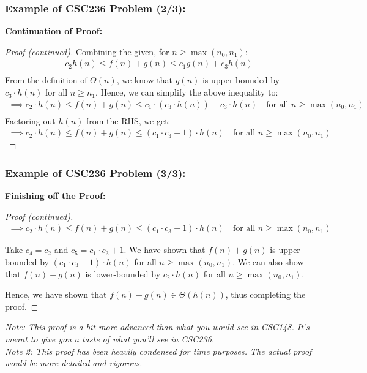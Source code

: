 \documentclass[hyperref={colorlinks,citecolor=blue,linkcolor=blue,urlcolor=blue}, aspectratio=1610]{beamer}
\begin{document}
\begin{frame}
  \frametitle{Example of CSC236 Problem (2/3):}
  \textbf{Continuation of Proof:}

  \begin{proof}[Proof (continued)]
    Combining the given, for $n \geq \max(n_0, n_1)$:
    \begin{align*}
      c_2h(n) \leq f(n) + g(n) \leq c_1g(n) + c_3h(n)\\
    \end{align*}
    \pause
    From the definition of $\Theta(n)$, we know that $g(n)$ is upper-bounded by $c_3 \cdot h(n)$ for all $n \geq n_1$. Hence, we can simplify the above inequality to:
    \begin{align*}
        \implies c_2 \cdot h(n) \leq f(n) + g(n) \leq c_1 \cdot \left(c_3 \cdot h(n)\right) + c_3 \cdot h(n) \quad \text{for all } n \geq \max(n_0, n_1) \\
    \end{align*}
    \vspace*{-1em}
    \pause
    Factoring out $h(n)$ from the RHS, we get:
    \begin{align*}
      \implies c_2 \cdot h(n) \leq f(n) + g(n) \leq (c_1 \cdot c_3 + 1) \cdot h(n) \quad \text{for all } n \geq \max(n_0, n_1)
    \end{align*}
    \vspace*{-1em}
  \end{proof}
\end{frame}

\begin{frame}
  \frametitle{Example of CSC236 Problem (3/3):}
  \textbf{Finishing off the Proof:}

  \begin{proof}[Proof (continued)]
    \begin{align*}
      \implies c_2 \cdot h(n) \leq f(n) + g(n) \leq (c_1 \cdot c_3 + 1) \cdot h(n) \quad \text{for all } n \geq \max(n_0, n_1)
    \end{align*}

    Take $c_4 = c_2$ and $c_5 = c_1 \cdot c_3 + 1$. We have shown that $f(n) + g(n)$ is upper-bounded by $(c_1 \cdot c_3 + 1) \cdot h(n)$ for all $n \geq \max(n_0, n_1)$. We can also show that $f(n) + g(n)$ is lower-bounded by $c_2 \cdot h(n)$ for all $n \geq \max(n_0, n_1)$.

    Hence, we have shown that $f(n) + g(n) \in \Theta(h(n))$, thus completing the proof.
  \end{proof}
  \textit{Note: This proof is a bit more advanced than what you would see in CSC148. It's meant to give you a taste of what you'll see in CSC236.}\\
  \textit{Note 2: This proof has been heavily condensed for time purposes. The actual proof would be more detailed and rigorous.}
\end{frame}
\end{document}
